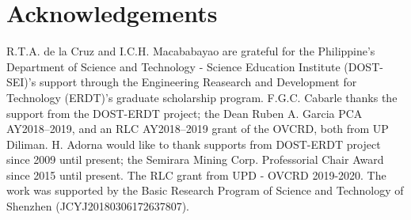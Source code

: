 \documentclass[runningheads,a4paper]{llncs}
\begin{document}
\section*{Acknowledgements}
R.T.A. de la Cruz and I.C.H. Macababayao  are grateful for the Philippine's Department of Science and Technology - Science Education Institute (DOST-SEI)'s support 
through the Engineering Reasearch and Development for Technology (ERDT)'s graduate scholarship program.
F.G.C. Cabarle thanks the support from the DOST-ERDT project; the Dean Ruben A. Garcia PCA AY2018--2019, and an RLC AY2018--2019 grant of the OVCRD, both from UP Diliman.
H. Adorna would like to thank supports from DOST-ERDT project since 2009 until present; the Semirara Mining Corp. Professorial Chair Award since 2015 until present. The RLC  grant from UPD - OVCRD 2019-2020.
The work was supported by the Basic Research Program of Science and Technology of Shenzhen (JCYJ20180306172637807).





\end{document}
